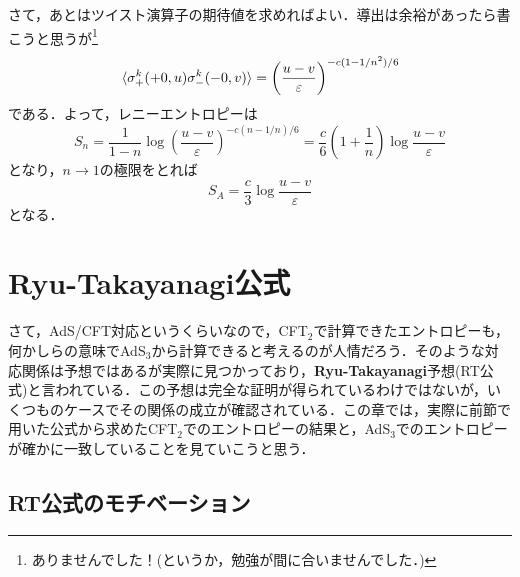 \documentclass[a4paper,uplatex,dvipdfmx]{jsarticle}
\theoremstyle{definition}
\begin{document}
さて，あとはツイスト演算子の期待値を求めればよい．導出は余裕があったら書こうと思うが\footnote{
  ありませんでした！(というか，勉強が間に合いませんでした．)
}
\begin{equation}
  \ev*{\sigma_{+}^{k}(+0,u)\sigma_{-}^{k}(-0,v)}
  =
  \left( \frac{u-v}{\varepsilon} \right)^{-c(1-1/n^2)/6}  
\end{equation}
である．よって，レニーエントロピーは
\begin{equation}
  S_{n}
  =
  \frac{1}{1-n}\log\left( \frac{u-v}{\varepsilon} \right)^{-c(n-1/n)/6}
  =
  \frac{c}{6}\left( 1+\frac{1}{n} \right)\log\frac{u-v}{\varepsilon}
\end{equation}
となり，$n\rightarrow 1$の極限をとれば
\begin{equation}
  S_{A}
  =
  \frac{c}{3}\log\frac{u-v}{\varepsilon}
  \label{entropy_cft}
\end{equation}
となる．


\section{Ryu-Takayanagi公式}

さて，AdS/CFT対応というくらいなので，CFT$_2$で計算できたエントロピーも，何かしらの意味でAdS$_3$から計算できると考えるのが人情だろう．そのような対応関係は予想ではあるが実際に見つかっており，\textbf{Ryu-Takayanagi}予想\cite{Ryu_AspectsHolographic_2006}(RT公式)と言われている．この予想は完全な証明が得られているわけではないが，いくつものケースでその関係の成立が確認されている．この章では，実際に前節で用いた公式から求めたCFT$_2$でのエントロピーの結果と，AdS$_3$でのエントロピーが確かに一致していることを見ていこうと思う．

\subsection{RT公式のモチベーション}
\end{document}
